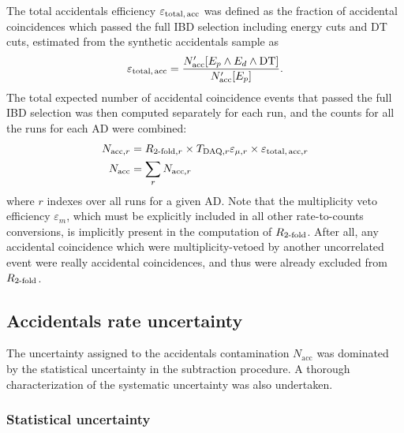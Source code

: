 The total accidentals efficiency $\varepsilon_\text{total,\,acc}$
was defined as the fraction of accidental  coincidences
which passed the full IBD selection including energy cuts and DT cuts,
estimated from the synthetic accidentals sample as
\begin{equation}\label{eq:eps_total_acc}
    \varepsilon_{\text{total,\,acc}} =
    \frac{N_\text{acc}'[E_p \wedge E_d \wedge \text{DT}]}{N_\text{acc}'[E_p]}.
\end{equation}
The total expected number of accidental coincidence events
that passed the full IBD selection was then computed
separately for each run, and the counts for all the runs for each AD were combined:
\begin{align}\label{eq:nacc}
    \begin{split}
        N_{\text{acc},r} &= R_{\text{\ensuremath{2}-fold},r}
            \times T_{\text{DAQ},r}\varepsilon_{\mu,r}
            \times \varepsilon_{\text{total,\,acc},r}\\
        N_\text{acc} &= \sum_r N_{\text{acc},r}
    \end{split}
\end{align}
where $r$ indexes over all runs for a given AD.
Note that the multiplicity veto efficiency $\varepsilon_m$,
which must be explicitly included in all other rate-to-counts conversions,
is implicitly present in the computation of $R_\text{\ensuremath{2}-fold}$.
After all, any accidental coincidence which were multiplicity-vetoed
by another uncorrelated event were really  accidental coincidences,
and thus were already excluded from $R_\text{\ensuremath{2}-fold}$.

\subsection{Accidentals rate uncertainty}
\label{subsec:acc_err}

The uncertainty assigned to the accidentals contamination $N_\text{acc}$
was dominated by the statistical uncertainty in the subtraction procedure.
A thorough characterization of the systematic uncertainty
was also undertaken.

\subsubsection{Statistical uncertainty}

